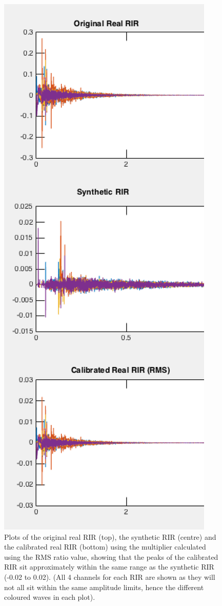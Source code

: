 \documentclass[../../main.tex]{subfiles}
\begin{document}
			\begin{figure}[H]
				\begin{center}
					\includegraphics[scale = 0.3]{Sections/Implementation/RealRIRs/images/calibration/CalRMS_RIR_edit2.png} 
					\caption{Plots of the original real \ac{RIR} (top), the synthetic \ac{RIR} (centre) and the calibrated real \ac{RIR} (bottom) using the multiplier calculated using the RMS ratio value, showing that the peaks of the calibrated \ac{RIR} sit approximately within the same range as the synthetic \ac{RIR} (-0.02 to 0.02). (All 4 channels for each \ac{RIR} are shown as they will not all sit within the same amplitude limits, hence the different coloured waves in each plot).}
					\label{calRMS}
				\end{center}
			\end{figure}
\end{document}
